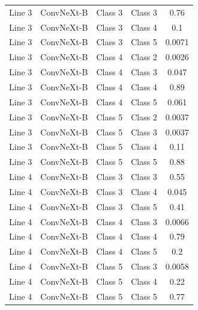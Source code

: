 \begin{table}[ht]
\begin{tabular}{llccc}
Line 3 & ConvNeXt-B & Class 3 & Class 3 & 0.76 \\
Line 3 & ConvNeXt-B & Class 3 & Class 4 & 0.1 \\
Line 3 & ConvNeXt-B & Class 3 & Class 5 & 0.0071 \\
Line 3 & ConvNeXt-B & Class 4 & Class 2 & 0.0026 \\
Line 3 & ConvNeXt-B & Class 4 & Class 3 & 0.047 \\
Line 3 & ConvNeXt-B & Class 4 & Class 4 & 0.89 \\
Line 3 & ConvNeXt-B & Class 4 & Class 5 & 0.061 \\
Line 3 & ConvNeXt-B & Class 5 & Class 2 & 0.0037 \\
Line 3 & ConvNeXt-B & Class 5 & Class 3 & 0.0037 \\
Line 3 & ConvNeXt-B & Class 5 & Class 4 & 0.11 \\
Line 3 & ConvNeXt-B & Class 5 & Class 5 & 0.88 \\
Line 4 & ConvNeXt-B & Class 3 & Class 3 & 0.55 \\
Line 4 & ConvNeXt-B & Class 3 & Class 4 & 0.045 \\
Line 4 & ConvNeXt-B & Class 3 & Class 5 & 0.41 \\
Line 4 & ConvNeXt-B & Class 4 & Class 3 & 0.0066 \\
Line 4 & ConvNeXt-B & Class 4 & Class 4 & 0.79 \\
Line 4 & ConvNeXt-B & Class 4 & Class 5 & 0.2 \\
Line 4 & ConvNeXt-B & Class 5 & Class 3 & 0.0058 \\
Line 4 & ConvNeXt-B & Class 5 & Class 4 & 0.22 \\
Line 4 & ConvNeXt-B & Class 5 & Class 5 & 0.77 \\
\hline
\end{tabular}
\end{table}
